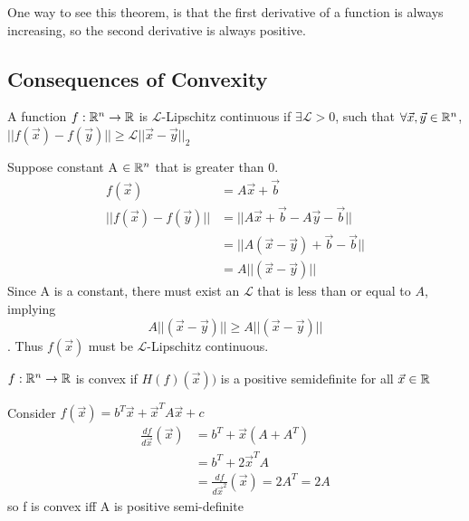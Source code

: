 \begin{remark}
    One way to see this theorem, is that the first derivative of a  \cvx{} function is always increasing, so the second derivative is always positive.
\end{remark}


\subsection{Consequences of Convexity}


\begin{definition}
A function $f: \R^n\rightarrow\R$ is $\mathcal{L}$-Lipschitz continuous if $\exists \mathcal{L}>0$, such that $\forall \vec{x}, \vec{y}\in \R^n$,$||f(\vec{x})-f(\vec{y})||\geq \mathcal{L}||\vec{x}-\vec{y}||_2$
\end{definition}

\begin{example}
Suppose constant A $\in \R^n$ that is greater than 0.
\begin{align}
    f(\vec{x})&=A\vec{x}+\vec{b}\\
||f(\vec{x})-f(\vec{y})||&=||A\vec{x}+\vec{b}-A\vec{y}-\vec{b}||\\
&=||A(\vec{x}-\vec{y})+\vec{b}-\vec{b}||\\
&=A||(\vec{x}-\vec{y})||
\end{align}
Since A is a constant, there must exist an $\mathcal{L}$ that is less than or equal to $A$, implying 
\begin{equation}
    A||(\vec{x}-\vec{y})||\geq A||(\vec{x}-\vec{y})||
\end{equation}. Thus $f(\vec{x})$ must be $\mathcal{L}$-Lipschitz continuous.
\end{example}

\begin{definition}
$f: \R^n\rightarrow\R$ is convex if $H(f)(\vec{x}))$ is a positive semidefinite for all $\vec{x}\in \R$
\end{definition}

\begin{example}
Consider $f(\vec{x})=b^T\vec{x} +\vec{x}^T A\vec{x}+c$
\begin{align*}
\frac{df}{d\vec{x}}(\vec{x})&=b^T+\vec{x}(A+A^T)\\
&=b^T+2\vec{x}^TA\\
&=\frac{df}{d\vec{x}^2}(\vec{x})=2A^T=2A
\end{align*}
so f is convex iff A is positive semi-definite
\end{example}

